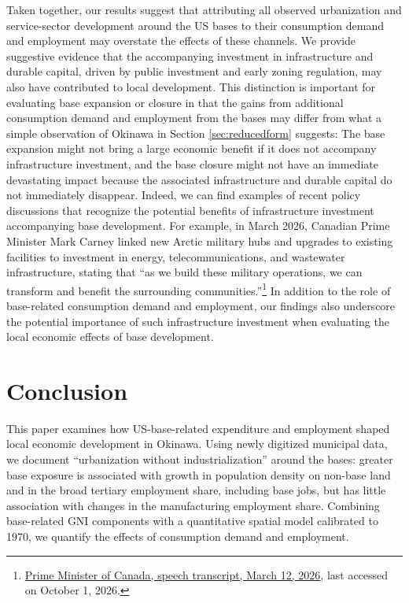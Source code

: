 \documentclass[12pt, unicode, a4paper]{article}
\newcommand{\1}{\mbox{1}\hspace{-0.25em}\mbox{l}} %
\begin{document}
Taken together, our results suggest that attributing all observed urbanization and service-sector development around the US bases to their consumption demand and employment may overstate the effects of these channels. We provide suggestive evidence that the accompanying investment in infrastructure and durable capital, driven by public investment and early zoning regulation, may also have contributed to local development. This distinction is important for evaluating base expansion or closure in that the gains from additional consumption demand and employment from the bases may differ from what a simple observation of Okinawa in Section \ref{sec:reducedform} suggests: The base expansion might not bring a large economic benefit if it does not accompany infrastructure investment, and the base closure might not have an immediate devastating impact because the associated infrastructure and durable capital do not immediately disappear. 
Indeed, we can find examples of recent policy discussions that recognize the potential benefits of infrastructure investment accompanying base development. For example, in March 2026, Canadian Prime Minister Mark Carney linked new Arctic military hubs and upgrades to existing facilities to investment in energy, telecommunications, and wastewater infrastructure, stating that ``as we build these military operations, we can transform and benefit the surrounding communities.''\footnote{\href{https://www.pm.gc.ca/en/videos/2026/03/12/prime-minister-carney-announces-new-plan-defend-build-and-transform-north}{Prime Minister of Canada, speech transcript, March 12, 2026}, last accessed on October 1, 2026.} In addition to the role of base-related consumption demand and employment, our findings also underscore the potential importance of such infrastructure investment when evaluating the local economic effects of base development.


\section{Conclusion}\label{sec:conclusion}

This paper examines how US-base-related expenditure and employment shaped local economic development in Okinawa. Using newly digitized municipal data, we document ``urbanization without industrialization'' around the bases: greater base exposure is associated with growth in population density on non-base land and in the broad tertiary employment share, including base jobs, but has little association with changes in the manufacturing employment share. Combining base-related GNI components with a quantitative spatial model calibrated to 1970, we quantify the effects of consumption demand and employment. 
\end{document}
